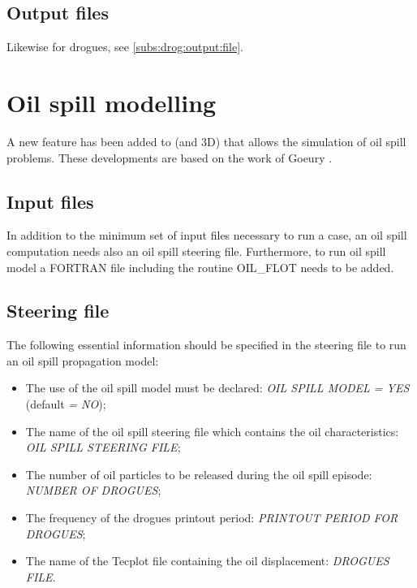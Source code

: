 \subsection{ Output files}

 Likewise for drogues, see \ref{subs:drog:output:file}.


\section{ Oil spill modelling}
\label{sec:oil:spill:modell}
 A new feature has been added to  (and 3D) that allows the simulation of oil spill problems. These developments are based on the work of Goeury \cite{goeury2012}.


\subsection{ Input files}

 In addition to the minimum set of input files necessary to run a  case, an oil spill computation needs also an oil spill steering file. Furthermore, to run oil spill model a FORTRAN file including the routine OIL\_FLOT needs to be added.


\subsection{ Steering file}

 The following essential information should be specified in the \telemac{} steering file to run an oil spill propagation model:

\begin{itemize}
\item  The use of the oil spill model must be declared: \textit{OIL SPILL MODEL = YES} (default\textit{ = NO});

\item  The name of the oil spill steering file which contains the oil characteristics: \textit{OIL SPILL STEERING FILE};

\item  The number of oil particles to be released during the oil spill episode: \textit{NUMBER OF DROGUES};

\item  The frequency of the drogues printout period: \textit{PRINTOUT PERIOD FOR DROGUES};

\item  The name of the Tecplot file containing the oil displacement: \textit{DROGUES FILE}.
\end{itemize}

